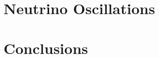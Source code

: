 \documentclass{ucbthesis}
\begin{document}


\chapter{Neutrino Oscillations}
\label{ch:intro}













\chapter{Conclusions}

\printbibliography

\appendix


\end{document}
